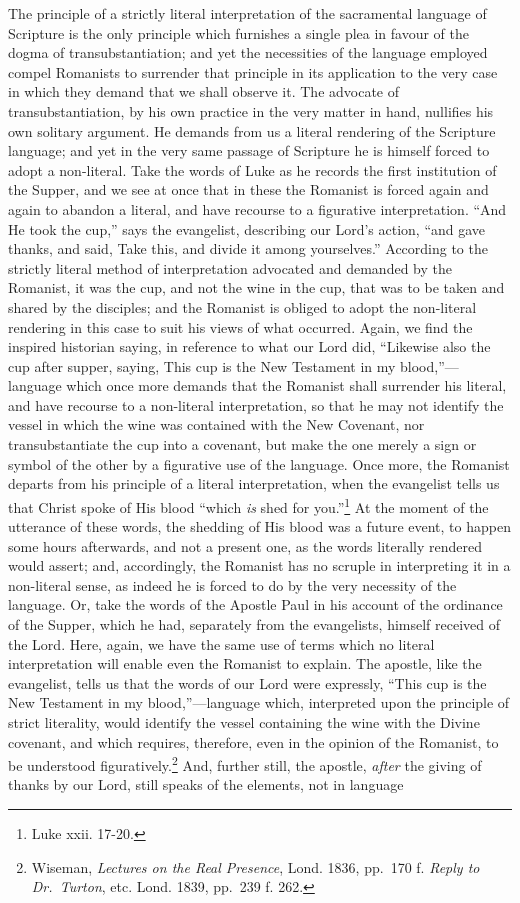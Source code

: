\documentclass[english,]{book}
\begin{document}
The principle of a strictly literal interpretation of the sacramental language of Scripture is the only principle which furnishes a single plea in favour of the dogma of transubstantiation; and yet the necessities of the language employed compel Romanists to surrender that principle in its application to the very case in which they demand that we shall observe it. The advocate of transubstantiation, by his own practice in the very matter in hand, nullifies his own solitary argument. He demands from us a literal rendering of the Scripture language; and yet in the very same passage of Scripture he is himself forced to adopt a non-literal. Take the words of Luke as he records the first institution of the Supper, and we see at once that in these the Romanist is forced again and again to abandon a literal, and have recourse to a figurative interpretation. ``And He took the cup,'' says the evangelist, describing our Lord's action, ``and gave thanks, and said, Take this, and divide it among yourselves.'' According to the strictly literal method of interpretation advocated and demanded by the Romanist, it was the cup, and not the wine in the cup, that was to be taken and shared by the disciples; and the Romanist is obliged to adopt the non-literal rendering in this case to suit his views of what occurred. Again, we find the inspired historian saying, in reference to what our Lord did, ``Likewise also the cup after supper, saying, This cup is the New Testament in my blood,''---language which once more demands that the Romanist shall surrender his literal, and have recourse to a non-literal interpretation, so that he may not identify the vessel in which the wine was contained with the New Covenant, nor transubstantiate the cup into a covenant, but make the one merely a sign or symbol of the other by a figurative use of the language. Once more, the Romanist departs from his principle of a literal interpretation, when the evangelist tells us that Christ spoke of His blood ``which \emph{is} shed for you.''\footnote{Luke xxii. 17-20.} At the moment of the utterance of these words, the shedding of His blood was a future event, to happen some hours afterwards, and not a present one, as the words literally rendered would assert; and, accordingly, the Romanist has no scruple in interpreting it in a non-literal sense, as indeed he is forced to do by the very necessity of the language. Or, take the words of the Apostle Paul in his account of the ordinance of the Supper, which he had, separately from the evangelists, himself received of the Lord. Here, again, we have the same use of terms which no literal interpretation will enable even the Romanist to explain. The apostle, like the evangelist, tells us that the words of our Lord were expressly, ``This cup is the New Testament in my blood,''---language which, interpreted upon the principle of strict literality, would identify the vessel containing the wine with the Divine covenant, and which requires, therefore, even in the opinion of the Romanist, to be understood figuratively.\footnote{Wiseman, \emph{Lectures on the Real Presence}, Lond. 1836, pp.~170 f. \emph{Reply to Dr.~Turton}, etc. Lond. 1839, pp.~239 f. 262.} And, further still, the apostle, \emph{after} the giving of thanks by our Lord, still speaks of the elements, not in language 
\end{document}
